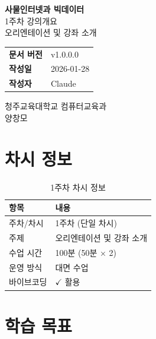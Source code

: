 \documentclass[11pt, a4paper]{article}
\begin{document}
\begin{titlepage}
\centering
\vspace*{3cm}

{\Huge\bfseries\color{NavyBlue} 사물인터넷과 빅데이터}\\[1cm]
{\LARGE 1주차 강의개요}\\[0.5cm]
{\Large 오리엔테이션 및 강좌 소개}\\[2cm]

\begin{info}
\centering
\begin{tabular}{l l}
\textbf{문서 버전} & v1.0.0.0 \\
\textbf{작성일} & 2026-01-28 \\
\textbf{작성자} & Claude \\
\end{tabular}
\end{info}

\vfill

{\large 청주교육대학교 컴퓨터교육과}\\[0.5cm]
{\large 양창모}

\end{titlepage}

\section{차시 정보}

\begin{table}[H]
\centering
\begin{tabularx}{\textwidth}{lX}
\toprule
\textbf{항목} & \textbf{내용} \\
\midrule
주차/차시 & 1주차 (단일 차시) \\
주제 & 오리엔테이션 및 강좌 소개 \\
수업 시간 & 100분 (50분 × 2) \\
운영 방식 & 대면 수업 \\
바이브코딩 & $\checkmark$ 활용 \\
\bottomrule
\end{tabularx}
\caption{1주차 차시 정보}
\end{table}

\section{학습 목표}
\end{document}
